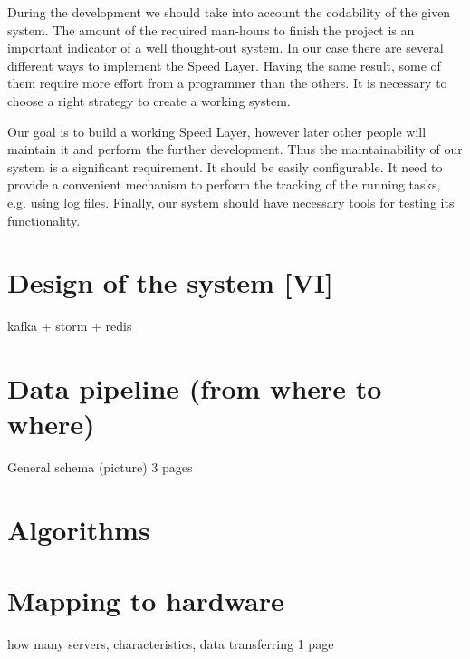 During the development we should take into account the codability of the given system.
The amount of the required man-hours to finish the project is an important indicator of a well thought-out system.
In our case there are several different ways to implement the Speed Layer.
Having the same result, some of them require more effort from a programmer than the others.
It is necessary to choose a right strategy to create a working system.

Our goal is to build a working Speed Layer, however later other people will maintain it and perform the further development.
Thus the maintainability of our system is a significant requirement.
It should be easily configurable.
It need to provide a convenient mechanism to perform the tracking of the running tasks, e.g. using log files.
Finally, our system should have necessary tools for testing its functionality.

\section{Design of the system [VI]}

kafka + storm + redis


\section{Data pipeline (from where to where)}
General schema (picture)
3 pages

\section{Algorithms}

\section{Mapping to hardware}
how many servers, characteristics, data transferring
1 page